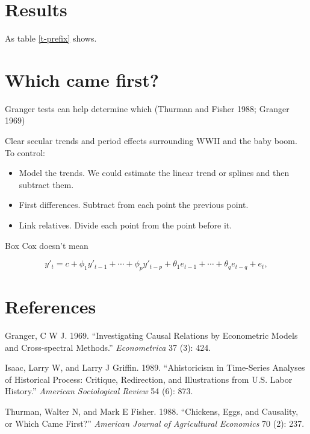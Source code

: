 \section{Results}\label{results}

As table \ref{t-prefix} shows.

\section{Which came first?}\label{which-came-first}

Granger tests can help determine which (Thurman and Fisher 1988; Granger
1969)

Clear secular trends and period effects surrounding WWII and the baby
boom. To control:

\begin{itemize}
\tightlist
\item
  Model the trends. We could estimate the linear trend or splines and
  then subtract them.
\item
  First differences. Subtract from each point the previous point.
\item
  Link relatives. Divide each point from the point before it.
\end{itemize}

Box Cox doesn't mean

\begin{equation}\tag{8.1}\label{eq-8-arima} y'_{t} = c +
\phi_{1}y'_{t-1} + \cdots + \phi_{p}y'_{t-p} +
\theta_{1}e_{t-1} + \cdots + \theta_{q}e_{t-q} + e_{t},
\end{equation}

\section*{References}\label{references}

\hypertarget{refs}{}
\hypertarget{ref-Granger:1969wx}{}
Granger, C W J. 1969. ``Investigating Causal Relations by Econometric
Models and Cross-spectral Methods.'' \emph{Econometrica} 37 (3): 424.

\hypertarget{ref-Isaac:1989hp}{}
Isaac, Larry W, and Larry J Griffin. 1989. ``Ahistoricism in Time-Series
Analyses of Historical Process: Critique, Redirection, and Illustrations
from U.S. Labor History.'' \emph{American Sociological Review} 54 (6):
873.

\hypertarget{ref-Thurman:1988va}{}
Thurman, Walter N, and Mark E Fisher. 1988. ``Chickens, Eggs, and
Causality, or Which Came First?'' \emph{American Journal of Agricultural
Economics} 70 (2): 237.
